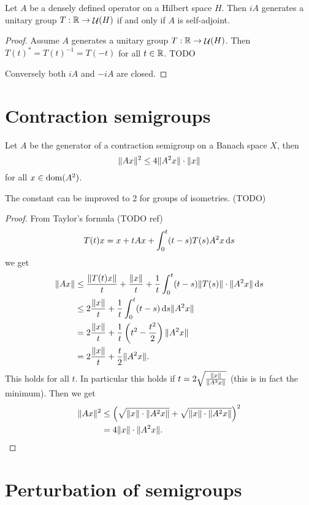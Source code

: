 \begin{theorem}
Let $A$ be a densely defined operator on a Hilbert space $H$. Then $iA$ generates a unitary group $T: \mathbb{R} \to \mathop{\mathcal{U}}\nolimits(H)$ \textup{if and only if} $A$ is self-adjoint.
\end{theorem}
\begin{proof}
Assume $A$ generates a unitary group $T: \mathbb{R} \to \mathop{\mathcal{U}}\nolimits(H)$. Then $T(t)^* = T(t)^{-1} = T(-t)$ for all $t\in \mathbb{R}$. TODO

Conversely both $iA$ and $-iA$ are closed.
\end{proof}

\section{Contraction semigroups}

\begin{proposition}
Let $A$ be the generator of a contraction semigroup on a Banach space $X$, then
\[ \lVert Ax\rVert^2 \leq 4 \lVert A^2x\rVert\cdot\lVert x\rVert \]
for all $x\in\operatorname{dom}(A^2)$.
\end{proposition}
The constant can be improved to 2 for groups of isometries. (TODO)
\begin{proof}
From Taylor's formula (TODO ref)
\[ T(t)x = x + tAx + \int_0^t(t-s)T(s)A^2x \operatorname{d \!}{s} \]
we get
\begin{align*}
\lVert Ax\rVert &\leq \frac{\lVert T(t)x\rVert}{t} + \frac{\lVert x\rVert}{t} + \frac{1}{t}\int_0^t(t-s)\lVert T(s)\rVert\cdot\lVert A^2x\rVert\operatorname{d \!}{s} \\
&\leq 2\frac{\lVert x\rVert}{t} + \frac{1}{t}\int_0^t(t-s)\operatorname{d \!}{s}\lVert A^2x\rVert \\
&= 2\frac{\lVert x\rVert}{t} + \frac{1}{t}\left(t^2 - \frac{t^2}{2}\right)\lVert A^2x\rVert \\
&= 2\frac{\lVert x\rVert}{t} + \frac{t}{2}\lVert A^2x\rVert.
\end{align*}
This holds for all $t$. In particular this holds if $t = 2\sqrt{\frac{\lVert x\rVert}{\lVert A^2x\rVert}}$ (this is in fact the minimum). Then we get
\begin{align*}
\lVert Ax\rVert^2 &\leq \left(\sqrt{\lVert x\rVert\cdot\lVert A^2x\rVert} + \sqrt{\lVert x\rVert\cdot\lVert A^2x\rVert}\right)^2 \\
&= 4\lVert x\rVert\cdot\lVert A^2x\rVert.
\end{align*}
\end{proof}

\section{Perturbation of semigroups}

